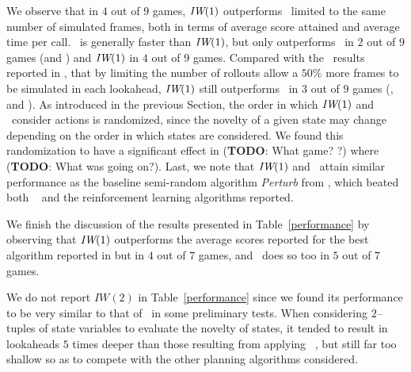 We observe that in $4$ out of $9$ games, ${\textit{IW}}(1)$ outperforms \UCT~limited to the same number
of simulated frames, both in terms of average score attained and average time per call. \BFS~is
generally faster than ${\textit{IW}}(1)$, but only outperforms \UCT~in $2$ out of $9$ games (\Freeway and
\Seaquest) and ${\textit{IW}}(1)$ in $4$ out of $9$ games. Compared with the \UCT~results reported
in \cite{bellemare:jair2013}, that by limiting the number of rollouts allow a $50$\% more frames
to be simulated in each lookahead, ${\textit{IW}}(1)$ still outperforms \UCT~in $3$ out of $9$ games
(\Breakout, \Enduro and \Freeway). As introduced in the previous Section, the order in which
${\textit{IW}}(1)$ and \BFS~consider actions is randomized, since the novelty of a given state may
change depending on the order in which states are considered. We found this randomization to
have a significant effect in (\textbf{TODO}: What game? \Qbert?) where (\textbf{TODO}: What was
going on?). Last, we note that ${\textit{IW}}(1)$ and \BFS~attain similar performance as the baseline
semi-random algorithm \emph{Perturb} from \cite{bellemare:jair2013}, which beated both \UCT~
and the reinforcement learning algorithms reported.

We finish the discussion of the results presented in Table~\ref{performance} by observing
that ${\textit{IW}}(1)$ outperforms the average scores reported for the best algorithm reported in
\cite{deep-mind-atari} but in $4$ out of $7$ games, and \BFS~does so too in $5$ out of $7$
games.

We do not report $IW(2)$ in Table~\ref{performance} since we found its performance to
be very similar to that of \BRFS~in some preliminary tests. When considering $2$--tuples
of state variables to evaluate the novelty of states, it tended to result in lookaheads
$5$ times deeper than those resulting from applying \BRFS~, but still far too shallow so
as to compete with the other planning algorithms considered.

